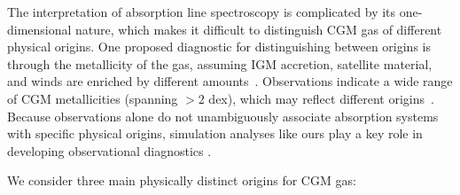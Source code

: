 \documentclass[fleqn,usenatbib]{mnras}
\begin{document}
The interpretation of absorption line spectroscopy is complicated by its one-dimensional nature, which makes it difficult to distinguish CGM gas of  different physical origins.
One proposed diagnostic for distinguishing between origins is through the metallicity of the gas, assuming IGM accretion, satellite material, and winds are enriched by different amounts~\citep[e.g.][]{Lehner2013,Fox2013,Wotta2016,Fumagalli2016,Hafen2016,Lehner2016,Prochaska2017}.
Observations indicate a wide range of CGM metallicities (spanning $>2$ dex), which may reflect different origins~\citep[e.g.][though see Stern et al. 2016 who use multi-density ionization modeling and infer a significantly narrower metallicity distribution]{Lehner2013,Fumagalli2016,Wotta2016,Prochaska2017,Zahedy2018}.
Because observations alone do not unambiguously associate absorption systems with specific physical origins, simulation analyses like ours play a key role in developing observational diagnostics \citep[for a review of efforts in this area, see][]{2017ASSL..430..271F}.

We consider three main physically distinct origins for CGM gas:
\end{document}
